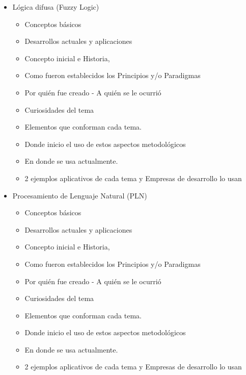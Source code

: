 \documentclass[12pt]{article}
\begin{document}
\begin{itemize}
    \item Lógica difusa (Fuzzy Logic)
    		\begin{itemize}
			\item Conceptos básicos
			\item Desarrollos actuales y aplicaciones
			\item Concepto inicial e Historia,
			\item Como fueron establecidos los Principios y/o Paradigmas
			\item Por quién fue creado - A quién se le ocurrió
			\item Curiosidades del tema
			\item Elementos que conforman cada tema.
			\item Donde inicio el uso de estos aspectos metodológicos
			\item En donde se usa actualmente.
			 \item 2 ejemplos aplicativos de cada tema y Empresas de desarrollo lo usan
		\end{itemize}
    
    \item Procesamiento de Lenguaje Natural (PLN)
    		\begin{itemize}
			\item Conceptos básicos
			\item Desarrollos actuales y aplicaciones
			\item Concepto inicial e Historia,
			\item Como fueron establecidos los Principios y/o Paradigmas
			\item Por quién fue creado - A quién se le ocurrió
			\item Curiosidades del tema
			\item Elementos que conforman cada tema.
			\item Donde inicio el uso de estos aspectos metodológicos
			\item En donde se usa actualmente.
			 \item 2 ejemplos aplicativos de cada tema y Empresas de desarrollo lo usan
		\end{itemize}
    

\end{itemize}
\end{document}
